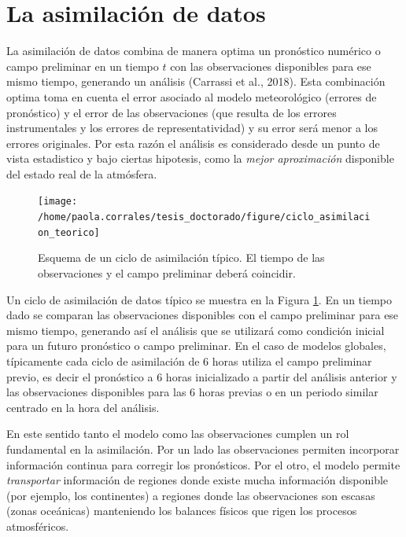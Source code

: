 \documentclass[12pt,oneside]{reedthesis}
\begin{document}
\hypertarget{la-asimilaciuxf3n-de-datos}{%
\section{La asimilación de datos}\label{la-asimilaciuxf3n-de-datos}}

La asimilación de datos combina de manera optima un pronóstico numérico o campo preliminar en un tiempo \(t\) con las observaciones disponibles para ese mismo tiempo, generando un análisis (Carrassi et al., 2018). Esta combinación optima toma en cuenta el error asociado al modelo meteorológico (errores de pronóstico) y el error de las observaciones (que resulta de los errores instrumentales y los errores de representatividad) y su error será menor a los errores originales. Por esta razón el análisis es considerado desde un punto de vista estadistico y bajo ciertas hipotesis, como la \emph{mejor aproximación} disponible del estado real de la atmósfera.


\begin{figure}

{\centering \texttt{[image: /home/paola.corrales/tesis\_doctorado/figure/ciclo\_asimilacion\_teorico]} 

}

\caption{Esquema de un ciclo de asimilación típico. El tiempo de las observaciones y el campo preliminar deberá coincidir.}\label{fig:ciclo-asimilacion-teorico}
\end{figure}
Un ciclo de asimilación de datos típico se muestra en la Figura \ref{fig:ciclo-asimilacion-teorico}. En un tiempo dado se comparan las observaciones disponibles con el campo preliminar para ese mismo tiempo, generando así el análisis que se utilizará como condición inicial para un futuro pronóstico o campo preliminar. En el caso de modelos globales, típicamente cada ciclo de asimilación de 6 horas utiliza el campo preliminar previo, es decir el pronóstico a 6 horas inicializado a partir del análisis anterior y las observaciones disponibles para las 6 horas previas o en un periodo similar centrado en la hora del análisis.

En este sentido tanto el modelo como las observaciones cumplen un rol fundamental en la asimilación. Por un lado las observaciones permiten incorporar información continua para corregir los pronósticos. Por el otro, el modelo permite \emph{transportar} información de regiones donde existe mucha información disponible (por ejemplo, los continentes) a regiones donde las observaciones son escasas (zonas oceánicas) manteniendo los balances físicos que rigen los procesos atmosféricos.
\end{document}
